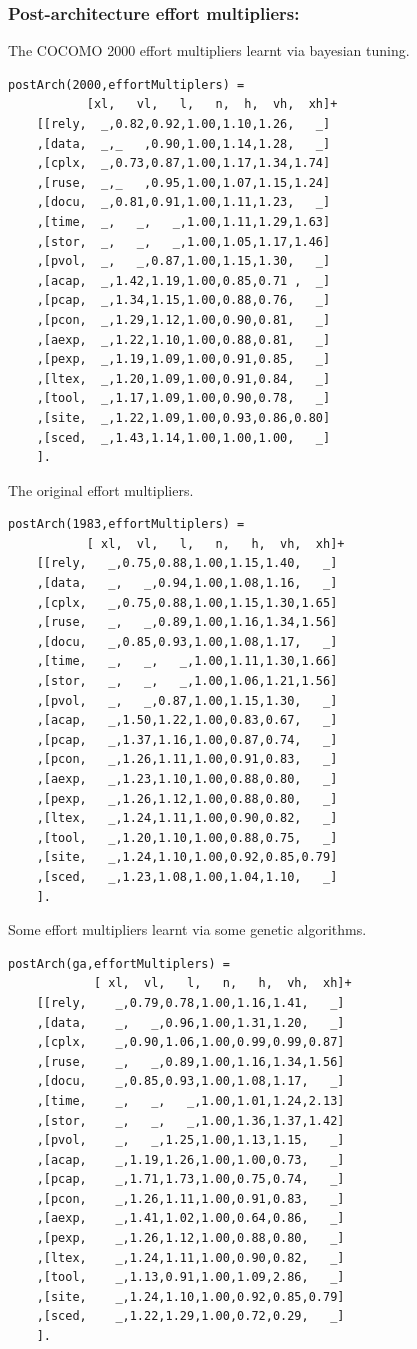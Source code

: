 \documentclass[twocolumn,global]{svjour}
\begin{document}
\subsubsection{ Post-architecture effort multipliers:
}
 The COCOMO 2000 effort multipliers learnt
via bayesian tuning.  \begin{Verbatim}
postArch(2000,effortMultiplers) =
           [xl,   vl,   l,   n,  h,  vh,  xh]+
    [[rely,  _,0.82,0.92,1.00,1.10,1.26,   _]
    ,[data,  _,_   ,0.90,1.00,1.14,1.28,   _]
    ,[cplx,  _,0.73,0.87,1.00,1.17,1.34,1.74]
    ,[ruse,  _,_   ,0.95,1.00,1.07,1.15,1.24]
    ,[docu,  _,0.81,0.91,1.00,1.11,1.23,   _]
    ,[time,  _,   _,   _,1.00,1.11,1.29,1.63]
    ,[stor,  _,   _,   _,1.00,1.05,1.17,1.46]
    ,[pvol,  _,   _,0.87,1.00,1.15,1.30,   _]
    ,[acap,  _,1.42,1.19,1.00,0.85,0.71 ,  _]
    ,[pcap,  _,1.34,1.15,1.00,0.88,0.76,   _]
    ,[pcon,  _,1.29,1.12,1.00,0.90,0.81,   _]
    ,[aexp,  _,1.22,1.10,1.00,0.88,0.81,   _]
    ,[pexp,  _,1.19,1.09,1.00,0.91,0.85,   _]
    ,[ltex,  _,1.20,1.09,1.00,0.91,0.84,   _]
    ,[tool,  _,1.17,1.09,1.00,0.90,0.78,   _]
    ,[site,  _,1.22,1.09,1.00,0.93,0.86,0.80]
    ,[sced,  _,1.43,1.14,1.00,1.00,1.00,   _]
    ].
\end{Verbatim}
 The original effort multipliers.  \begin{Verbatim}
postArch(1983,effortMultiplers) =
           [ xl,  vl,   l,   n,   h,  vh,  xh]+
    [[rely,   _,0.75,0.88,1.00,1.15,1.40,   _]
    ,[data,   _,   _,0.94,1.00,1.08,1.16,   _]
    ,[cplx,   _,0.75,0.88,1.00,1.15,1.30,1.65]
    ,[ruse,   _,   _,0.89,1.00,1.16,1.34,1.56]
    ,[docu,   _,0.85,0.93,1.00,1.08,1.17,   _]
    ,[time,   _,   _,   _,1.00,1.11,1.30,1.66]
    ,[stor,   _,   _,   _,1.00,1.06,1.21,1.56]
    ,[pvol,   _,   _,0.87,1.00,1.15,1.30,   _]
    ,[acap,   _,1.50,1.22,1.00,0.83,0.67,   _]
    ,[pcap,   _,1.37,1.16,1.00,0.87,0.74,   _]
    ,[pcon,   _,1.26,1.11,1.00,0.91,0.83,   _]
    ,[aexp,   _,1.23,1.10,1.00,0.88,0.80,   _]
    ,[pexp,   _,1.26,1.12,1.00,0.88,0.80,   _]
    ,[ltex,   _,1.24,1.11,1.00,0.90,0.82,   _]
    ,[tool,   _,1.20,1.10,1.00,0.88,0.75,   _]
    ,[site,   _,1.24,1.10,1.00,0.92,0.85,0.79]
    ,[sced,   _,1.23,1.08,1.00,1.04,1.10,   _]
    ].
\end{Verbatim}
 Some effort multipliers learnt via some
genetic algorithms.  \begin{Verbatim}
postArch(ga,effortMultiplers) =
            [ xl,  vl,   l,   n,   h,  vh,  xh]+
    [[rely,    _,0.79,0.78,1.00,1.16,1.41,   _]
    ,[data,    _,   _,0.96,1.00,1.31,1.20,   _]
    ,[cplx,    _,0.90,1.06,1.00,0.99,0.99,0.87]
    ,[ruse,    _,   _,0.89,1.00,1.16,1.34,1.56]
    ,[docu,    _,0.85,0.93,1.00,1.08,1.17,   _]
    ,[time,    _,   _,   _,1.00,1.01,1.24,2.13]
    ,[stor,    _,   _,   _,1.00,1.36,1.37,1.42]
    ,[pvol,    _,   _,1.25,1.00,1.13,1.15,   _]
    ,[acap,    _,1.19,1.26,1.00,1.00,0.73,   _]
    ,[pcap,    _,1.71,1.73,1.00,0.75,0.74,   _]
    ,[pcon,    _,1.26,1.11,1.00,0.91,0.83,   _]
    ,[aexp,    _,1.41,1.02,1.00,0.64,0.86,   _]
    ,[pexp,    _,1.26,1.12,1.00,0.88,0.80,   _]
    ,[ltex,    _,1.24,1.11,1.00,0.90,0.82,   _]
    ,[tool,    _,1.13,0.91,1.00,1.09,2.86,   _]
    ,[site,    _,1.24,1.10,1.00,0.92,0.85,0.79]
    ,[sced,    _,1.22,1.29,1.00,0.72,0.29,   _]
    ].
\end{Verbatim}
\end{document}
